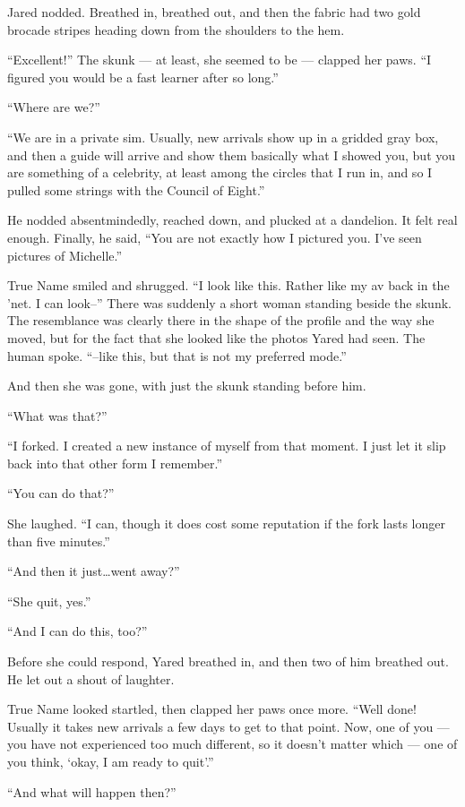 Jared nodded. Breathed in, breathed out, and then the fabric had two gold brocade stripes heading down from the shoulders to the hem.

``Excellent!'' The skunk — at least, she seemed to be — clapped her paws. ``I figured you would be a fast learner after so long.''

``Where are we?''

``We are in a private sim. Usually, new arrivals show up in a gridded gray box, and then a guide will arrive and show them basically what I showed you, but you are something of a celebrity, at least among the circles that I run in, and so I pulled some strings with the Council of Eight.''

He nodded absentmindedly, reached down, and plucked at a dandelion. It felt real enough. Finally, he said, ``You are not exactly how I pictured you. I've seen pictures of Michelle.''

True Name smiled and shrugged. ``I look like this. Rather like my av back in the 'net. I can look--'' There was suddenly a short woman standing beside the skunk. The resemblance was clearly there in the shape of the profile and the way she moved, but for the fact that she looked like the photos Yared had seen. The human spoke. ``--like this, but that is not my preferred mode.''

And then she was gone, with just the skunk standing before him.

``What was that?''

``I forked. I created a new instance of myself from that moment. I just let it slip back into that other form I remember.''

``You can do that?''

She laughed. ``I can, though it does cost some reputation if the fork lasts longer than five minutes.''

``And then it just\ldots went away?''

``She quit, yes.''

``And I can do this, too?''

Before she could respond, Yared breathed in, and then two of him breathed out. He let out a shout of laughter.

True Name looked startled, then clapped her paws once more. ``Well done! Usually it takes new arrivals a few days to get to that point. Now, one of you — you have not experienced too much different, so it doesn't matter which — one of you think, `okay, I am ready to quit'.''

``And what will happen then?''

